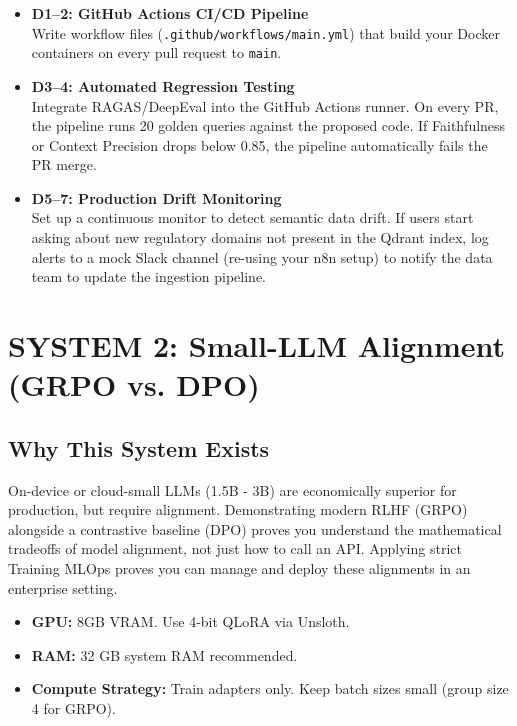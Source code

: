 \documentclass[11pt,a4paper]{article}
\begin{document}
\begin{tcolorbox}[systembox={ Step-by-Step: CI/CD \& Drift Monitoring}]
\begin{itemize}[leftmargin=*]
    \item \textbf{D1–2: GitHub Actions CI/CD Pipeline}\\
          Write workflow files (\texttt{.github/workflows/main.yml}) that build your Docker containers on every pull request to \texttt{main}.
    \item \textbf{D3–4: Automated Regression Testing}\\
          Integrate RAGAS/DeepEval into the GitHub Actions runner. On every PR, the pipeline runs 20 golden queries against the proposed code. If Faithfulness or Context Precision drops below 0.85, the pipeline automatically fails the PR merge.
    \item \textbf{D5–7: Production Drift Monitoring}\\
          Set up a continuous monitor to detect semantic data drift. If users start asking about new regulatory domains not present in the Qdrant index, log alerts to a mock Slack channel (re-using your n8n setup) to notify the data team to update the ingestion pipeline.
\end{itemize}
\end{tcolorbox}


\newpage
\section*{SYSTEM 2: Small-LLM Alignment (GRPO vs. DPO)}

\subsection*{Why This System Exists}
On-device or cloud-small LLMs (1.5B - 3B) are economically superior for production, but require alignment. Demonstrating modern RLHF (GRPO) alongside a contrastive baseline (DPO) proves you understand the mathematical tradeoffs of model alignment, not just how to call an API. Applying strict Training MLOps proves you can manage and deploy these alignments in an enterprise setting.

\begin{tcolorbox}[warnbox={️ Hardware Constraints}]
\begin{itemize}[leftmargin=*]
    \item \textbf{GPU:} 8GB VRAM. Use 4-bit QLoRA via Unsloth.
    \item \textbf{RAM:} 32 GB system RAM recommended.
    \item \textbf{Compute Strategy:} Train adapters only. Keep batch sizes small (group size 4 for GRPO).
\end{itemize}
\end{tcolorbox}
\end{document}
